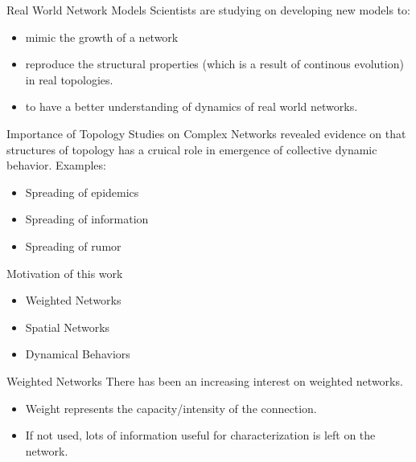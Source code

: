 \documentclass{beamer}
\begin{document}

\begin{frame}{Real World Network Models}
Scientists are studying on developing new models to:
\begin{itemize}
 \item mimic the growth of a network
 \item reproduce the structural properties (which is a result of continous evolution) in real topologies.
 \item to have a better understanding of dynamics of real world networks.
\end{itemize}
\end{frame}



\begin{frame}{Importance of Topology}
Studies on Complex Networks revealed evidence on that structures of topology has a cruical role in emergence of collective dynamic behavior. Examples:
\begin{itemize}
 \item Spreading of epidemics
 \item Spreading of information
 \item Spreading of rumor
\end{itemize}
\end{frame}

\begin{frame}{Motivation of this work}
\begin{itemize}
 \item Weighted Networks
 \item Spatial Networks
 \item Dynamical Behaviors
\end{itemize}
\end{frame}


\begin{frame}{Weighted Networks}
There has been an increasing interest on weighted networks.
\begin{itemize}
 \item Weight represents the capacity/intensity of the connection. 
 \item If not used, lots of information useful for characterization is left on the network.
\end{itemize}
\end{frame}
\end{document}
